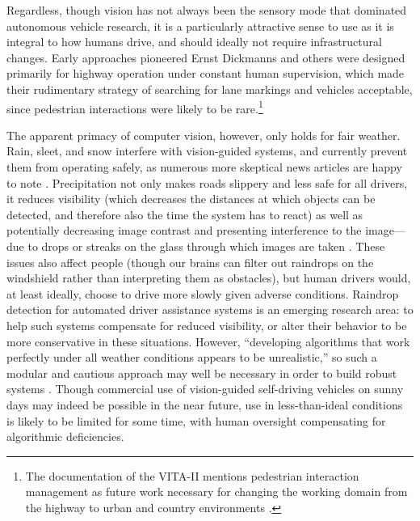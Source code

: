 
Regardless, though vision has not always been the sensory mode that dominated
autonomous vehicle research, it is a particularly attractive sense to
use as it is integral to how humans drive, and should ideally not
require infrastructural changes. Early approaches pioneered Ernst
Dickmanns and others were designed primarily for 
highway operation under constant human supervision, which made their
rudimentary strategy of searching for lane markings and vehicles
acceptable, since pedestrian interactions were likely to be
rare.\footnote{The documentation of the VITA-II mentions pedestrian
  interaction management as future work necessary for changing the
  working domain from the highway to urban and country environments \cite{ulmerVITA-II}.}



The apparent primacy of computer vision, however, only holds for fair
weather. Rain, sleet, and 
snow interfere with vision-guided systems, and currently prevent them
from operating safely, as numerous more skeptical news articles are
happy to note \cite{knightFurther} \cite{gomesObstacles}.
Precipitation not only makes roads slippery 
and less safe for all drivers, it reduces visibility (which decreases
the distances at which objects can be detected, and therefore also the
time the system has to react) as well as potentially decreasing image
contrast and presenting interference to the image---due to drops or
streaks on the glass through which images are taken
\cite{rainADAS}. These issues also 
affect people (though our brains can filter out raindrops on the
windshield rather than interpreting them as obstacles), but human
drivers would, at least ideally, choose to drive more slowly given
adverse conditions. Raindrop detection for automated driver
assistance systems is an emerging research area: to help such systems compensate for
reduced visibility, or alter their behavior to be more conservative in
these situations. However, ``developing algorithms that work perfectly
under all weather conditions appears to be unrealistic,'' so such a
modular and cautious approach may well be necessary in order to build
robust systems \cite[p. 50]{rainADAS}. Though commercial use of
vision-guided self-driving vehicles on 
sunny days may indeed be possible in the near future, use in
less-than-ideal conditions is likely to be limited for some time,
with human oversight compensating for algorithmic deficiencies. 

